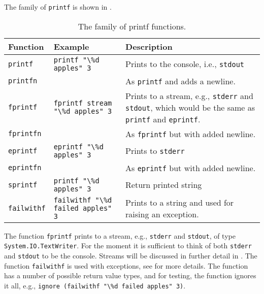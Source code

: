 The family of \lstinline!printf! is shown in .
\begin{table}
  \centering
  \begin{tabularx}{\linewidth}{|l|l|X|}
    \hline
    \rowcolor{headerRowColor} Function & Example & Description\\
    \hline
    \lstinline!printf! & \lstinline!printf "\%d apples" 3! & Prints to the console, i.e., \lstinline!stdout!\\
    \lstinline!printfn! &  & As \lstinline!printf! and adds a newline.\\
    \hline
    \lstinline!fprintf! & \lstinline!fprintf stream "\%d apples" 3! & Prints to a stream, e.g., \lstinline!stderr! and \lstinline!stdout!, which would be the same as \lstinline!printf! and \lstinline!eprintf!.\\
    \lstinline!fprintfn! & & As \lstinline!fprintf! but with added newline.\\
    \hline
    \lstinline!eprintf! & \lstinline!eprintf "\%d apples" 3! & Prints to \lstinline!stderr!\\
    \lstinline!eprintfn! & & As \lstinline!eprintf! but with added newline.\\
    \hline
    \lstinline!sprintf! & \lstinline!printf "\%d apples" 3! & Return printed string\\
    \hline
    \lstinline!failwithf! & \lstinline!failwithf "\%d failed apples" 3! & Prints to a string and used for raising an exception.\\
    \hline
  \end{tabularx}
  \caption{The family of printf functions.}
  \label{tab:printfFamily}
\end{table}
The function \lstinline!fprintf! prints to a stream, e.g., \lstinline!stderr! and \lstinline!stdout!, of type \lstinline!System.IO.TextWriter!. For the moment it is sufficient to think of both \lstinline!stderr! and \lstinline!stdout! to be the console. Streams will be discussed in further detail in . The function \lstinline!failwithf! is used with exceptions, see  for more details. The function has a number of possible return value types, and for testing, the  function ignores it all, e.g., \mbox{\lstinline!ignore (failwithf "\%d failed apples" 3)!}.

